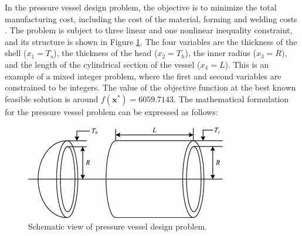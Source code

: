 

In the pressure vessel design problem, the objective is to minimize the total manufacturing cost, including the cost of the material, forming and welding costs \citep{PV}. The problem is subject to three linear and one nonlinear inequality constraint, and its structure is shown in Figure \ref{fig:PV}. The four variables are the thickness of the shell ($x_1 = T_s$), the thickness of the head ($x_2 = T_h$), the inner radius ($x_3 = R$), and the length of the cylindrical section of the vessel ($x_4 = L$). This is an example of a mixed integer problem, where the first and second variables are constrained to be integers. The value of the objective function at the best known feasible solution is around $f(\bm{x}^*) = 6059.7143$. The mathematical formulation for the pressure vessel problem can be expressed as follows:

\vspace{-0.5cm}



\vspace{0.5cm}

\begin{figure}[h]
    \begin{center}
    \includegraphics[scale=0.6]{img/Problems/PV.png}
    \end{center}
    \captionsetup{justification=centering}
    \caption{Schematic view of pressure vessel design problem.}\label{fig:PV}
\end{figure}
